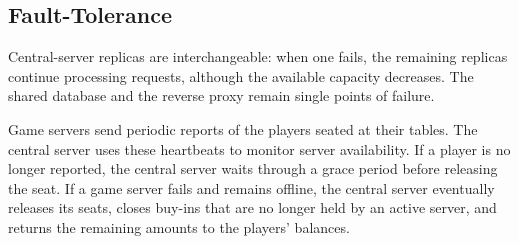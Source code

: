 \documentclass{scrartcl}
\begin{document}



\subsection{Fault-Tolerance}\label{fault-tolerance}

Central-server replicas are interchangeable: when one fails, the remaining replicas continue processing requests, although 
the available capacity decreases. The shared database and the reverse proxy remain single points of failure.

Game servers send periodic reports of the players seated at their tables. The central server uses these heartbeats to monitor server 
availability. If a player is no longer reported, the central server waits through a grace period before releasing the seat. If a game server fails and remains offline, the central server eventually 
releases its seats, closes buy-ins that are no longer held by an active server, and returns the remaining amounts to the players' balances.
\end{document}
